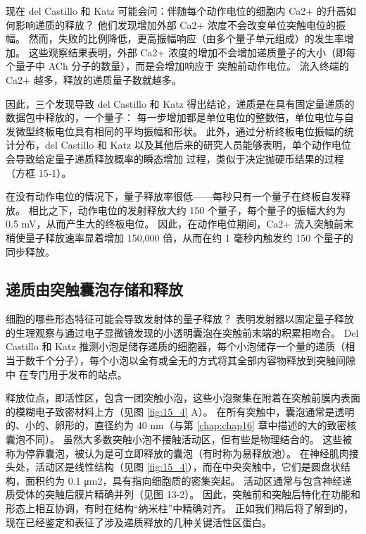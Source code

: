 现在 del Castillo 和 Katz 可能会问：伴随每个动作电位的细胞内 Ca2+ 的升高如何影响递质的释放？ 他们发现增加外部 Ca2+ 浓度不会改变单位突触电位的振幅。 
然而，失败的比例降低，更高振幅响应（由多个量子单元组成）的发生率增加。 
这些观察结果表明，外部 Ca2+ 浓度的增加不会增加递质量子的大小（即每个量子中 ACh 分子的数量），而是会增加响应于 突触前动作电位。 
流入终端的 Ca2+ 越多，释放的递质量子数就越多。


因此，三个发现导致 del Castillo 和 Katz 得出结论，递质是在具有固定量递质的数据包中释放的，一个量子： 每一步增加都是单位电位的整数倍，单位电位与自发微型终板电位具有相同的平均振幅和形状。 
此外，通过分析终板电位振幅的统计分布，del Castillo 和 Katz 以及其他后来的研究人员能够表明，单个动作电位会导致给定量子递质释放概率的瞬态增加 过程，类似于决定抛硬币结果的过程（方框 15-1）。


在没有动作电位的情况下，量子释放率很低——每秒只有一个量子在终板自发释放。 
相比之下，动作电位的发射释放大约 150 个量子，每个量子的振幅大约为 0.5 mV，从而产生大的终板电位。 
因此，在动作电位期间，Ca2+ 流入突触前末梢使量子释放速率显着增加 150,000 倍，从而在约 1 毫秒内触发约 150 个量子的同步释放。



\subsection{递质由突触囊泡存储和释放}

细胞的哪些形态特征可能会导致发射体的量子释放？ 
表明发射器以固定量子释放的生理观察与通过电子显微镜发现的小透明囊泡在突触前末端的积累相吻合。 
Del Castillo 和 Katz 推测小泡是储存递质的细胞器，每个小泡储存一个量的递质（相当于数千个分子），每个小泡以全有或全无的方式将其全部内容物释放到突触间隙中 在专门用于发布的站点。


释放位点，即活性区，包含一团突触小泡，这些小泡聚集在附着在突触前膜内表面的模糊电子致密材料上方（见图 \ref{fig:15_4} A）。 
在所有突触中，囊泡通常是透明的、小的、卵形的，直径约为 40 nm（与第 \ref{chap:chap16} 章中描述的大的致密核囊泡不同）。 
虽然大多数突触小泡不接触活动区，但有些是物理结合的。 
这些被称为停靠囊泡，被认为是可立即释放的囊泡（有时称为易释放池）。 
在神经肌肉接头处，活动区是线性结构（见图 \ref{fig:15_4}），而在中央突触中，它们是圆盘状结构，面积约为 0.1 μm2，具有指向细胞质的密集突起。 
活动区通常与包含神经递质受体的突触后膜片精确并列（见图 13-2）。 
因此，突触前和突触后特化在功能和形态上相互协调，有时在结构“纳米柱”中精确对齐。 
正如我们稍后将了解到的，现在已经鉴定和表征了涉及递质释放的几种关键活性区蛋白。


